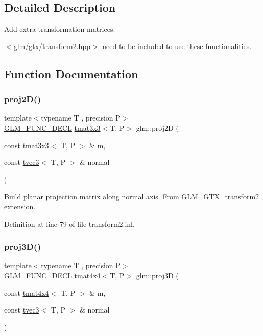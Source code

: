 \subsection{Detailed Description}
Add extra transformation matrices. 

$<$\mbox{\hyperlink{transform2_8hpp}{glm/gtx/transform2.\+hpp}}$>$ need to be included to use these functionalities. 

\subsection{Function Documentation}
\mbox{\label{group__gtx__transform2_gacfce1085167a8bfb71a55ea14d22752f}} 
\subsubsection{\texorpdfstring{proj2D()}{proj2D()}}
{\footnotesize\ttfamily template$<$typename T , precision P$>$ \\
\mbox{\hyperlink{setup_8hpp_ab2d052de21a70539923e9bcbf6e83a51}{G\+L\+M\+\_\+\+F\+U\+N\+C\+\_\+\+D\+E\+CL}} \mbox{\hyperlink{structglm_1_1tmat3x3}{tmat3x3}}$<$T, P$>$ glm\+::proj2D (\begin{DoxyParamCaption}\item[{const \mbox{\hyperlink{structglm_1_1tmat3x3}{tmat3x3}}$<$ T, P $>$ \&}]{m,  }\item[{const \mbox{\hyperlink{structglm_1_1tvec3}{tvec3}}$<$ T, P $>$ \&}]{normal }\end{DoxyParamCaption})}

Build planar projection matrix along normal axis. From G\+L\+M\+\_\+\+G\+T\+X\+\_\+transform2 extension. 

Definition at line 79 of file transform2.\+inl.

\mbox{\label{group__gtx__transform2_gafab0418f2503ec2133cb2de828cc482a}} 
\subsubsection{\texorpdfstring{proj3D()}{proj3D()}}
{\footnotesize\ttfamily template$<$typename T , precision P$>$ \\
\mbox{\hyperlink{setup_8hpp_ab2d052de21a70539923e9bcbf6e83a51}{G\+L\+M\+\_\+\+F\+U\+N\+C\+\_\+\+D\+E\+CL}} \mbox{\hyperlink{structglm_1_1tmat4x4}{tmat4x4}}$<$T, P$>$ glm\+::proj3D (\begin{DoxyParamCaption}\item[{const \mbox{\hyperlink{structglm_1_1tmat4x4}{tmat4x4}}$<$ T, P $>$ \&}]{m,  }\item[{const \mbox{\hyperlink{structglm_1_1tvec3}{tvec3}}$<$ T, P $>$ \&}]{normal }\end{DoxyParamCaption})}

